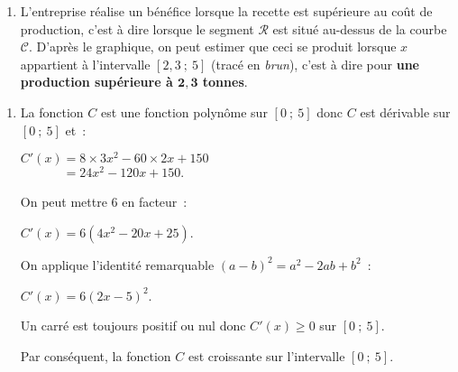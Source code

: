 \begin{corrige}
\begin{enumerate}
{          }
          \par
          \item L'entreprise réalise un bénéfice lorsque la recette est supérieure au coût de production, c'est à dire lorsque le segment $\mathscr{R}$ est situé au-dessus de la courbe $\mathscr{C}$.
          D'après le graphique, on peut estimer que ceci se produit lorsque $x$ appartient à l'intervalle $[2,3~;~5]$ (tracé en \textit{brun}), c'est à dire pour \textbf{une production supérieure à $\bm{2,3}$ tonnes}.
          \par
     \end{enumerate}
     \par
     \par
     \begin{enumerate}
          \item La fonction $C$ est une fonction polynôme sur $[0~;~5]$ donc $C$ est dérivable sur $[0~;~5]$ et~:
          \par
          $C'(x)= 8 \times 3x^2 - 60 \times 2x + 150$\\
          $\phantom{C'(x)}= 24x^2 - 120x + 150.$
          \par
          On peut mettre $6$ en facteur~:
          \par
          $C'(x)= 6(4x^2-20x+25)$.
          \par
          On applique l'identité remarquable $(a-b)^2=a^2-2ab+b^2$~:
          \par
          $C'(x)= 6(2x-5)^2$.
          \par
          Un carré est toujours positif ou nul donc $C'(x) \geqslant 0$ sur $[0~;~5]$.
          \par
          Par conséquent, la fonction $C$ est croissante sur l'intervalle $[0~;~5]$.
          \par
          \par

\end{enumerate}
\end{corrige}
